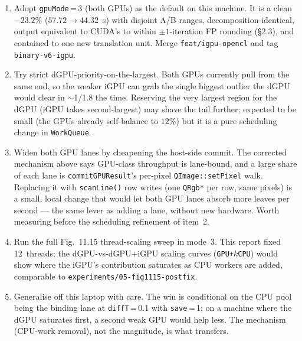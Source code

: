\documentclass[
	english,
	letterpaper, oneside
]{article}
\begin{document}
\begin{enumerate}
    \item Adopt \texttt{gpuMode}\,=\,3 (both GPUs) as the default on this
    machine. It is a clean $-23.2\%$ ($57.72\to44.32$~s) with disjoint A/B ranges,
    decomposition-identical, output equivalent to CUDA's to within $\pm1$-iteration
    FP rounding (\S2.3), and contained to one new translation unit. Merge
    \texttt{feat/igpu-opencl} and tag \texttt{binary-v6-igpu}.

    \item Try strict dGPU-priority-on-the-largest. Both GPUs currently pull
    from the same end, so the weaker iGPU can grab the single biggest outlier the
    dGPU would clear in $\sim$1/1.8 the time. Reserving the very largest region for
    the dGPU (iGPU takes second-largest) may shave the tail further; expected to be
    small (the GPUs already self-balance to $12\%$) but it is a pure scheduling
    change in \texttt{WorkQueue}.

    \item Widen both GPU lanes by cheapening the host-side commit. The
    corrected mechanism above says GPU-class throughput is lane-bound, and a
    large share of each lane is \texttt{commitGPUResult}'s per-pixel
    \texttt{QImage::setPixel} walk. Replacing it with \texttt{scanLine()} row
    writes (one \texttt{QRgb*} per row, same pixels) is a small, local change that
    would let both GPU lanes absorb more leaves per second --- the same
    lever as adding a lane, without new hardware. Worth measuring before the
    scheduling refinement of item~2.

    \item Run the full Fig.~11.15 thread-scaling sweep in mode~3. This
    report fixed 12~threads; the dGPU-vs-dGPU+iGPU scaling curves
    (\texttt{GPU+}$k$\texttt{CPU}) would show where the iGPU's contribution
    saturates as CPU workers are added, comparable to
    \texttt{experiments/05-fig1115-postfix}.

    \item Generalise off this laptop with care. The win is conditional on
    the CPU pool being the binding lane at \texttt{diffT}\,=\,0.1 with
    \texttt{save}\,=\,1; on a machine where the dGPU saturates first, a second weak
    GPU would help less. The mechanism (CPU-work removal), not the magnitude,
    is what transfers.
\end{enumerate}

\end{document}
